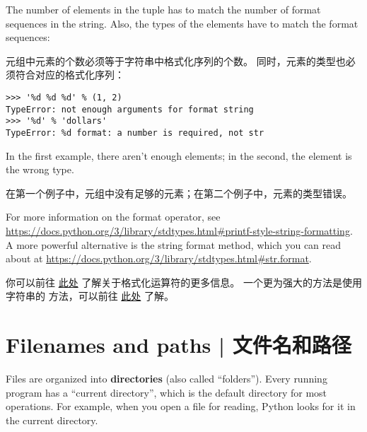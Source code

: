 {{{{{{{%
The number of elements in the tuple has to match the number
of format sequences in the string.  Also, the types of the
elements have to match the format sequences:

元组中元素的个数必须等于字符串中格式化序列的个数。
同时，元素的类型也必须符合对应的格式化序列：

\begin{lstlisting}
>>> '%d %d %d' % (1, 2)
TypeError: not enough arguments for format string
>>> '%d' % 'dollars'
TypeError: %d format: a number is required, not str
\end{lstlisting}
%
In the first example, there aren't enough elements; in the
second, the element is the wrong type.

在第一个例子中，元组中没有足够的元素；在第二个例子中，元素的类型错误。

For more information on the format operator, see
\url{https://docs.python.org/3/library/stdtypes.html#printf-style-string-formatting}.  A more powerful alternative is the string
format method, which you can read about at
\url{https://docs.python.org/3/library/stdtypes.html#str.format}.

你可以前往 \href{https://docs.python.org/3/library/stdtypes.html#printf-style-string-formatting}{此处} 了解关于格式化运算符的更多信息。
一个更为强大的方法是使用字符串的  方法，可以前往 \href{https://docs.python.org/3/library/stdtypes.html#str.format}{此处} 了解。




\section{Filenames and paths  |  文件名和路径}
\label{paths}
  
  

Files are organized into {\bf directories} (also called ``folders'').
Every running program has a ``current directory'', which is the
default directory for most operations.
For example, when you open a file for reading, Python looks for it in the
current directory.

}}}}}}}
